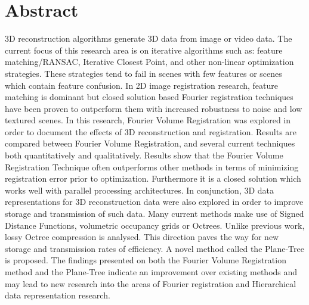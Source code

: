 \makeatletter
\chapter{Abstract}

3D reconstruction algorithms generate 3D data from image or video data. The current focus of this research area is on iterative algorithms such as: feature matching/RANSAC, Iterative Closest Point, and other non-linear optimization strategies. These strategies tend to fail in scenes with few features or scenes which contain feature confusion. In 2D image registration research, feature matching is dominant but closed solution based Fourier registration techniques have been proven to outperform them with increased robustness to noise and low textured scenes. In this research, Fourier Volume Registration was explored in order to document the effects of 3D reconstruction and registration. Results are compared between Fourier Volume Registration, and several current techniques both quantitatively and qualitatively. Results show that the Fourier Volume Registration Technique often outperforms other methods in terms of minimizing registration error prior to optimization. Furthermore it is a closed solution which works well with parallel processing architectures. In conjunction, 3D data representations for 3D reconstruction data were also explored in order to improve storage and transmission of such data. Many current methods make use of Signed Distance Functions, volumetric occupancy grids or Octrees. Unlike previous work, lossy Octree compression is analysed. This direction paves the way for new storage and transmission rates of efficiency. A novel method called the Plane-Tree is proposed. The findings presented on both the Fourier Volume Registration method and the Plane-Tree indicate an improvement over existing methods and may lead to new research into the areas of Fourier registration and Hierarchical data representation research.


